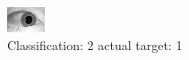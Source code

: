 \begin{figure}[h!]
\begin{center}
\includegraphics[width=0.60\columnwidth]{figures/ID1421_class_2_target_1.png}
\end{center}
\caption{ Classification: 2 actual target: 1}
\label{fig:ID1421_class_2_target_1}
\end{figure}
